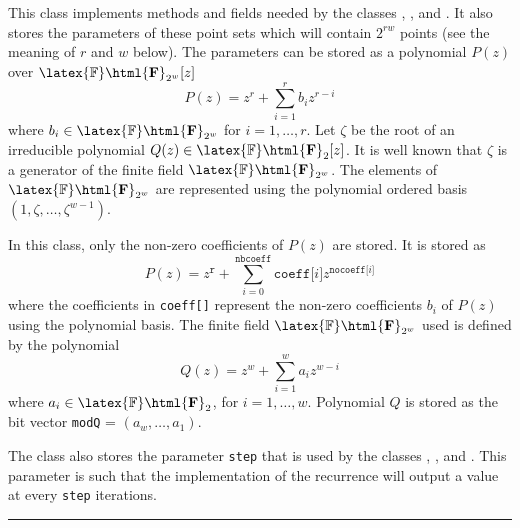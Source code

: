 
This class implements methods and fields needed by the classes
 ,
 ,
  and
 .
It also stores the parameters of these point sets which will contain
$2^{rw}$ points (see the meaning of $r$ and $w$ below).
The parameters can be stored as a polynomial $P(z)$ over
 $\latex{\mathbb{F}}\html{\mathbf{F}}_{2^w}[z]$
$$
P(z) = z^{r} + \sum_{i=1}^{r} b_i z^{r-i}
$$
where $b_i\in \latex{\mathbb{F}}\html{\mathbf{F}}_{2^w}$ for $i=1,\ldots,r$.
 Let $\zeta$ be the root of an irreducible polynomial
 $Q(z)\in \latex{\mathbb{F}}\html{\mathbf{F}}_2[z]$.  It is well known
that $\zeta$ is a generator of the finite field
 $\latex{\mathbb{F}}\html{\mathbf{F}}_{2^w}$.
The elements of $\latex{\mathbb{F}}\html{\mathbf{F}}_{2^w}$ are
 represented using the polynomial ordered
 basis $(1,\zeta,\ldots,\zeta^{w-1})$.

In this class, only the non-zero coefficients of $P(z)$ are stored.
 It is stored as
$$
P(z) = z^{\mathtt{r}} + \sum_{i=0}^{\mathtt{nbcoeff}} {\mathtt{coeff[}}i{\mathtt{]}}
   z^{{\mathtt{nocoeff[}}i{\mathtt{]}}}
$$
where the coefficients in \texttt{coeff[]} represent the non-zero
 coefficients $b_i$ of $P(z)$ using the polynomial basis.
The finite field $\latex{\mathbb{F}}\html{\mathbf{F}}_{2^w}$ used is
 defined by the polynomial
$$
Q(z) = z^{w} +  \sum_{i=1}^{w} a_i z^{w-i}
$$
where $a_i\in \latex{\mathbb{F}}\html{\mathbf{F}}_{2}$,
 for $i=1,\ldots,w$. Polynomial $Q$ is
 stored as the bit vector {\texttt{modQ}} = $(a_w,\ldots,a_1)$.

The class also stores the parameter \texttt{step} that is used by the classes
,
 ,
  and
 .
This parameter is such that the implementation of the recurrence
 will output a value  at every {\texttt{step}} iterations.

\bigskip\hrule\bigskip

